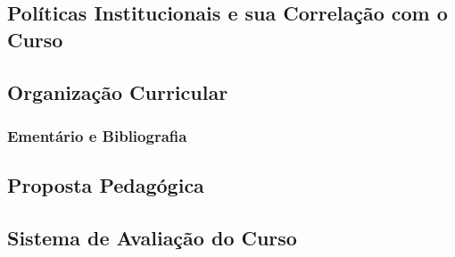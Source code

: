 

\subsection{Pol\'iticas Institucionais e sua Correla\c{c}\~ao com o Curso}


\subsection{Organiza\c{c}\~ao Curricular}


\subsubsection{Ement\'ario e Bibliografia}


\newpage

\subsection{Proposta Pedag\'ogica}


\subsection{Sistema de Avalia\c{c}\~ao do Curso}



